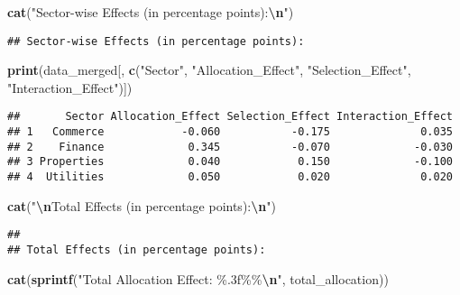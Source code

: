 \documentclass[
]{article}
\newenvironment{Shaded}{\begin{snugshade}}{\end{snugshade}}
\newcommand{\FunctionTok}[1]{\textcolor[rgb]{0.13,0.29,0.53}{\textbf{#1}}}
\newcommand{\NormalTok}[1]{#1}
\newcommand{\SpecialCharTok}[1]{\textcolor[rgb]{0.81,0.36,0.00}{\textbf{#1}}}
\newcommand{\StringTok}[1]{\textcolor[rgb]{0.31,0.60,0.02}{#1}}
\begin{document}
\begin{Shaded}
\begin{Highlighting}[]
\FunctionTok{cat}\NormalTok{(}\StringTok{"Sector{-}wise Effects (in percentage points):}\SpecialCharTok{\textbackslash{}n}\StringTok{"}\NormalTok{)}
\end{Highlighting}
\end{Shaded}

\begin{verbatim}
## Sector-wise Effects (in percentage points):
\end{verbatim}

\begin{Shaded}
\begin{Highlighting}[]
\FunctionTok{print}\NormalTok{(data\_merged[, }\FunctionTok{c}\NormalTok{(}\StringTok{"Sector"}\NormalTok{, }\StringTok{"Allocation\_Effect"}\NormalTok{, }\StringTok{"Selection\_Effect"}\NormalTok{, }\StringTok{"Interaction\_Effect"}\NormalTok{)])}
\end{Highlighting}
\end{Shaded}

\begin{verbatim}
##       Sector Allocation_Effect Selection_Effect Interaction_Effect
## 1   Commerce            -0.060           -0.175              0.035
## 2    Finance             0.345           -0.070             -0.030
## 3 Properties             0.040            0.150             -0.100
## 4  Utilities             0.050            0.020              0.020
\end{verbatim}

\begin{Shaded}
\begin{Highlighting}[]
\FunctionTok{cat}\NormalTok{(}\StringTok{"}\SpecialCharTok{\textbackslash{}n}\StringTok{Total Effects (in percentage points):}\SpecialCharTok{\textbackslash{}n}\StringTok{"}\NormalTok{)}
\end{Highlighting}
\end{Shaded}

\begin{verbatim}
## 
## Total Effects (in percentage points):
\end{verbatim}

\begin{Shaded}
\begin{Highlighting}[]
\FunctionTok{cat}\NormalTok{(}\FunctionTok{sprintf}\NormalTok{(}\StringTok{"Total Allocation Effect: \%.3f\%\%}\SpecialCharTok{\textbackslash{}n}\StringTok{"}\NormalTok{, total\_allocation))}
\end{Highlighting}
\end{Shaded}
\end{document}
